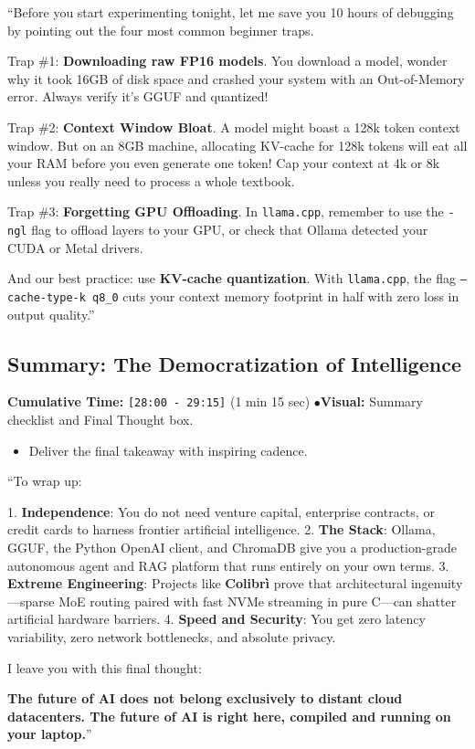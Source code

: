 \documentclass[11pt,a4paper]{article}
\begin{document}
\begin{speechbox}
``Before you start experimenting tonight, let me save you 10 hours of debugging by pointing out the four most common beginner traps.

Trap \#1: \textbf{Downloading raw FP16 models}. You download a model, wonder why it took 16GB of disk space and crashed your system with an Out-of-Memory error. Always verify it's GGUF and quantized!

Trap \#2: \textbf{Context Window Bloat}. A model might boast a 128k token context window. But on an 8GB machine, allocating KV-cache for 128k tokens will eat all your RAM before you even generate one token! Cap your context at 4k or 8k unless you really need to process a whole textbook.

Trap \#3: \textbf{Forgetting GPU Offloading}. In \texttt{llama.cpp}, remember to use the \texttt{-ngl} flag to offload layers to your GPU, or check that Ollama detected your CUDA or Metal drivers.

And our best practice: use \textbf{KV-cache quantization}. With \texttt{llama.cpp}, the flag \texttt{--cache-type-k q8\_0} cuts your context memory footprint in half with zero loss in output quality.''
\end{speechbox}

\subsection{Summary: The Democratization of Intelligence}
\begin{directionbox}
    \textbf{Cumulative Time:} \texttt{[28:00 - 29:15]} (1 min 15 sec) \quad$\bullet$\quad \textbf{Visual:} Summary checklist and Final Thought box.
    \begin{itemize}
        \item Deliver the final takeaway with inspiring cadence.
    \end{itemize}
\end{directionbox}

\begin{speechbox}
``To wrap up:

1. \textbf{Independence}: You do not need venture capital, enterprise contracts, or credit cards to harness frontier artificial intelligence.
2. \textbf{The Stack}: Ollama, GGUF, the Python OpenAI client, and ChromaDB give you a production-grade autonomous agent and RAG platform that runs entirely on your own terms.
3. \textbf{Extreme Engineering}: Projects like \textbf{Colibr\`i} prove that architectural ingenuity---sparse MoE routing paired with fast NVMe streaming in pure C---can shatter artificial hardware barriers.
4. \textbf{Speed and Security}: You get zero latency variability, zero network bottlenecks, and absolute privacy.

I leave you with this final thought:

\textbf{The future of AI does not belong exclusively to distant cloud datacenters. The future of AI is right here, compiled and running on your laptop.}''
\end{speechbox}
\end{document}
